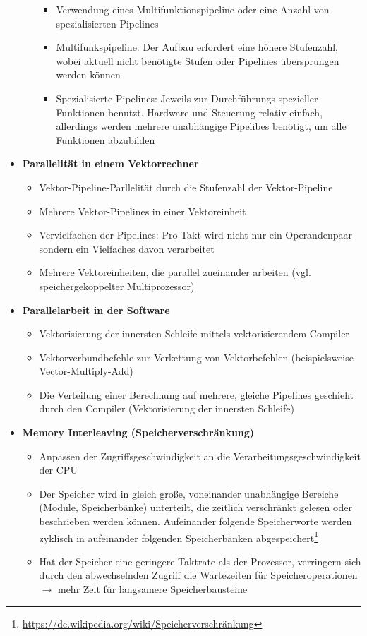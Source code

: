 \begin{itemize}
\begin{itemize}
\begin{itemize}
			\item Verwendung eines Multifunktionspipeline oder eine Anzahl von spezialisierten Pipelines
			\item Multifunkspipeline: Der Aufbau erfordert eine höhere Stufenzahl, wobei aktuell nicht benötigte Stufen oder Pipelines übersprungen werden können
			\item Spezialisierte Pipelines: Jeweils zur Durchführungs spezieller Funktionen benutzt. Hardware und Steuerung relativ einfach, allerdings werden mehrere unabhängige Pipelibes benötigt, um alle Funktionen abzubilden
		\end{itemize} 
	\end{itemize}
	\item \textbf{Parallelität in einem Vektorrechner}
	\begin{itemize}
		\item Vektor-Pipeline-Parllelität durch die Stufenzahl der Vektor-Pipeline
		\item Mehrere Vektor-Pipelines in einer Vektoreinheit
		\item Vervielfachen der Pipelines: Pro Takt wird nicht nur ein Operandenpaar sondern ein Vielfaches davon verarbeitet
		\item Mehrere Vektoreinheiten, die parallel zueinander arbeiten (vgl. speichergekoppelter Multiprozessor)
	\end{itemize}
	\item \textbf{Parallelarbeit in der Software}
	\begin{itemize}
		\item Vektorisierung der innersten Schleife mittels vektorisierendem Compiler
		\item Vektorverbundbefehle zur Verkettung von Vektorbefehlen (beispielsweise Vector-Multiply-Add)
		\item Die Verteilung einer Berechnung auf mehrere, gleiche Pipelines geschieht durch den Compiler (Vektorisierung der innersten Schleife)
	\end{itemize}
	\item \textbf{Memory Interleaving (Speicherverschränkung)}
	\begin{itemize}
		\item Anpassen der Zugriffsgeschwindigkeit an die Verarbeitungsgeschwindigkeit der CPU
		\item Der Speicher wird in gleich große, voneinander unabhängige Bereiche (Module, Speicherbänke) unterteilt, die zeitlich verschränkt gelesen oder beschrieben werden können. Aufeinander folgende Speicherworte werden zyklisch in aufeinander folgenden Speicherbänken abgespeichert\footnote{\url{https://de.wikipedia.org/wiki/Speicherverschränkung}}
		\item Hat der Speicher eine geringere Taktrate als der Prozessor, verringern sich durch den abwechselnden Zugriff die Wartezeiten für Speicheroperationen \(\rightarrow\) mehr Zeit für langsamere Speicherbausteine
	\end{itemize}
\end{itemize}


